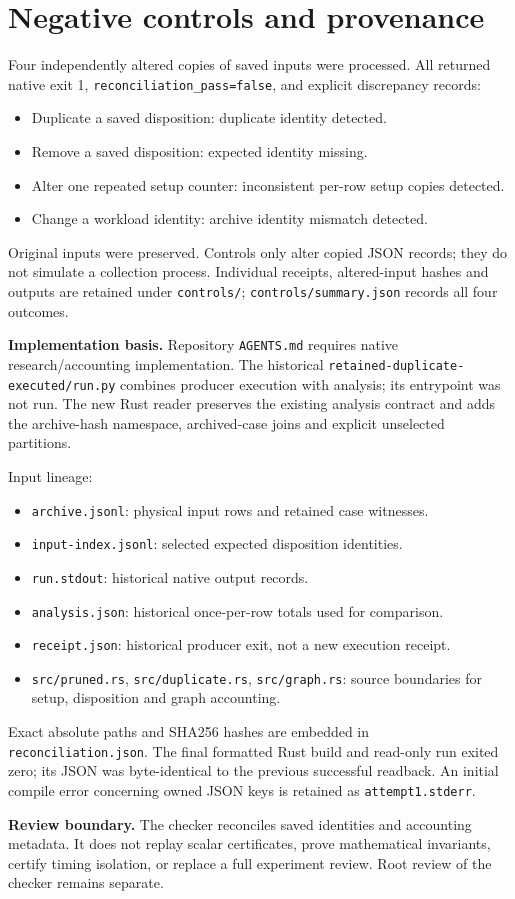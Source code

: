 \documentclass[11pt]{article}
\begin{document}
\section*{Negative controls and provenance}
Four independently altered copies of saved inputs were processed. All returned native exit 1, \texttt{reconciliation\_pass=false}, and explicit discrepancy records:
\begin{itemize}
\item Duplicate a saved disposition: duplicate identity detected.
\item Remove a saved disposition: expected identity missing.
\item Alter one repeated setup counter: inconsistent per-row setup copies detected.
\item Change a workload identity: archive identity mismatch detected.
\end{itemize}
Original inputs were preserved. Controls only alter copied JSON records; they do not simulate a collection process. Individual receipts, altered-input hashes and outputs are retained under \texttt{controls/}; \texttt{controls/summary.json} records all four outcomes.

\textbf{Implementation basis.} Repository \texttt{AGENTS.md} requires native research/accounting implementation. The historical \texttt{retained-duplicate-executed/run.py} combines producer execution with analysis; its entrypoint was not run. The new Rust reader preserves the existing analysis contract and adds the archive-hash namespace, archived-case joins and explicit unselected partitions.

Input lineage:
\begin{itemize}
\item \texttt{archive.jsonl}: physical input rows and retained case witnesses.
\item \texttt{input-index.jsonl}: selected expected disposition identities.
\item \texttt{run.stdout}: historical native output records.
\item \texttt{analysis.json}: historical once-per-row totals used for comparison.
\item \texttt{receipt.json}: historical producer exit, not a new execution receipt.
\item \texttt{src/pruned.rs}, \texttt{src/duplicate.rs}, \texttt{src/graph.rs}: source boundaries for setup, disposition and graph accounting.
\end{itemize}
Exact absolute paths and SHA256 hashes are embedded in \texttt{reconciliation.json}. The final formatted Rust build and read-only run exited zero; its JSON was byte-identical to the previous successful readback. An initial compile error concerning owned JSON keys is retained as \texttt{attempt1.stderr}.

\textbf{Review boundary.} The checker reconciles saved identities and accounting metadata. It does not replay scalar certificates, prove mathematical invariants, certify timing isolation, or replace a full experiment review. Root review of the checker remains separate.
\end{document}
